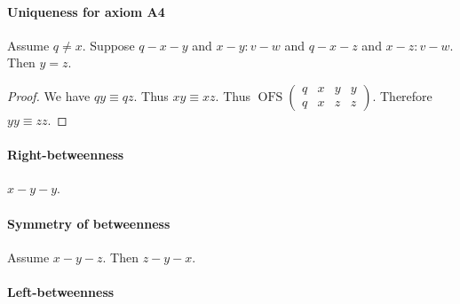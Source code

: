 \documentclass{article}
\newcommand{\Cong}[4]{#1 #2 \equiv #3 #4}
\newcommand{\OFS}[8]{\operatorname{OFS}
\left(\begin{smallmatrix}%
#1 & #2 & #3 & #4 \\
#5 & #6 & #7 & #8
\end{smallmatrix}\right)%
}
\begin{document}
  \paragraph{Uniqueness for axiom A4}

  \begin{forthel}
    \begin{lemma} %
      Assume $q \neq x$.
      Suppose $q-x-y$ and $x-y : v-w$ and $q-x-z$ and $x-z : v-w$.
      Then $y = z$.
    \end{lemma}
    \begin{proof}
      We have $\Cong{q}{y}{q}{z}$.
      Thus $\Cong{x}{y}{x}{z}$.
      Thus $\OFS{q}{x}{y}{y}{q}{x}{z}{z}$.
      Therefore $\Cong{y}{y}{z}{z}$.
    \end{proof}
  \end{forthel}


  \paragraph{Right-betweenness}

  \begin{forthel}
    \begin{lemma} %
      $x-y-y$.
    \end{lemma}
  \end{forthel}


  \paragraph{Symmetry of betweenness}

  \begin{forthel}
    \begin{lemma}[SymmetryBetweenness] %
      Assume $x-y-z$. Then $z-y-x$.
    \end{lemma}
  \end{forthel}


  \paragraph{Left-betweenness}
\end{document}
